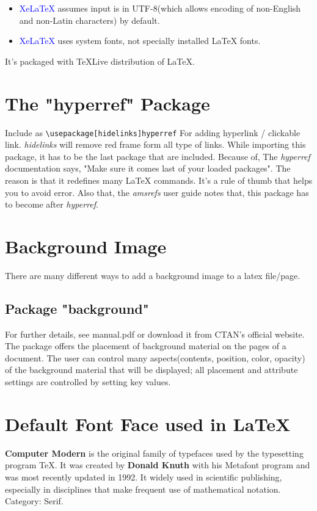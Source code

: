 \begin{itemize}
	\item \textcolor{blue}{XeLaTeX} assumes input is in UTF-8(which allows encoding of non-English and non-Latin characters) by default.
	\item \textcolor{blue}{XeLaTeX} uses system fonts, not specially installed \LaTeX{} fonts.
\end{itemize}

It's packaged with TeXLive distribution of \LaTeX{}.

\section{The "hyperref" Package}
Include as \texttt{\textbackslash usepackage[hidelinks]{hyperref}} For adding hyperlink / clickable link. \textit{hidelinks} will remove red frame form all type of links. While importing this package, it has to be the last package that are included. Because of, The \textit{hyperref} documentation says, "Make sure it comes last of your loaded packages". The reason is that it redefines many \LaTeX{} commands. It's a rule of thumb that helps you to avoid error. Also that, the \textit{amsrefs} user guide notes that, this package has to become after \textit{hyperref}.

\section{Background Image}
There are many different ways to add a background image to a latex file/page.

\subsection{Package "background"}
For further details, see manual.pdf or download it from CTAN's official website. The package offers the placement of background material on the pages of a document. The user can control many aspects(contents, position, color, opacity) of the background material that will be displayed; all placement and attribute settings are controlled by setting key values.

\section{Default Font Face used in \LaTeX{}}
\textbf{Computer Modern} is the original family of typefaces used by the typesetting program TeX. It was created by \textbf{Donald Knuth} with his Metafont program and was most recently updated in 1992. It widely used in scientific publishing, especially in disciplines that make frequent use of mathematical notation. Category: Serif.